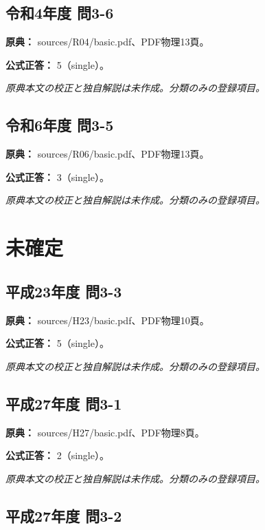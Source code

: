 \subsection{令和4年度 問3-6}
\label{q:r04-reg-basic-3-6}

\noindent\textbf{原典：} sources/R04/basic.pdf、PDF物理13頁。

\textbf{公式正答：} 5（single）。

\par\textit{原典本文の校正と独自解説は未作成。分類のみの登録項目。}

\subsection{令和6年度 問3-5}
\label{q:r06-reg-basic-3-5}

\noindent\textbf{原典：} sources/R06/basic.pdf、PDF物理13頁。

\textbf{公式正答：} 3（single）。

\par\textit{原典本文の校正と独自解説は未作成。分類のみの登録項目。}

\section{未確定}

\subsection{平成23年度 問3-3}
\label{q:h23-reg-basic-3-3}

\noindent\textbf{原典：} sources/H23/basic.pdf、PDF物理10頁。

\textbf{公式正答：} 5（single）。

\par\textit{原典本文の校正と独自解説は未作成。分類のみの登録項目。}

\subsection{平成27年度 問3-1}
\label{q:h27-reg-basic-3-1}

\noindent\textbf{原典：} sources/H27/basic.pdf、PDF物理8頁。

\textbf{公式正答：} 2（single）。

\par\textit{原典本文の校正と独自解説は未作成。分類のみの登録項目。}

\subsection{平成27年度 問3-2}
\label{q:h27-reg-basic-3-2}

